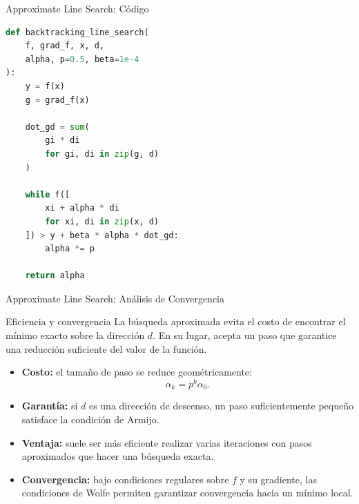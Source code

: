\begin{frame}[fragile]{Approximate Line Search: Código}
\begin{lstlisting}[language=Python,basicstyle=\ttfamily\tiny]
def backtracking_line_search(
    f, grad_f, x, d,
    alpha, p=0.5, beta=1e-4
):
    y = f(x)
    g = grad_f(x)

    dot_gd = sum(
        gi * di
        for gi, di in zip(g, d)
    )

    while f([
        xi + alpha * di
        for xi, di in zip(x, d)
    ]) > y + beta * alpha * dot_gd:
        alpha *= p

    return alpha
\end{lstlisting}
\end{frame}


\begin{frame}{Approximate Line Search: Análisis de Convergencia}
    \begin{alertblock}{Eficiencia y convergencia}
        \footnotesize
        La búsqueda aproximada evita el costo de encontrar el mínimo exacto
        sobre la dirección $d$. En su lugar, acepta un paso que garantice
        una reducción suficiente del valor de la función.
    \end{alertblock}

    \scriptsize
    \begin{itemize}
        \item \textbf{Costo:} el tamaño de paso se reduce geométricamente:
        \[
            \alpha_k=p^k\alpha_0.
        \]

        \item \textbf{Garantía:} si $d$ es una dirección de descenso,
        un paso suficientemente pequeño satisface la condición de Armijo.

        \item \textbf{Ventaja:} suele ser más eficiente realizar varias
        iteraciones con pasos aproximados que hacer una búsqueda exacta.

        \item \textbf{Convergencia:} bajo condiciones regulares sobre
        $f$ y su gradiente, las condiciones de Wolfe permiten garantizar
        convergencia hacia un mínimo local.
    \end{itemize}
\end{frame}